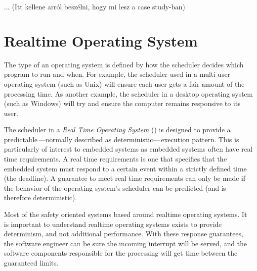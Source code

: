 ... (Itt kellene arról beszélni, hogy mi lesz a case study-ban)

\section{Realtime Operating System}

The type of an operating system is defined by how the scheduler decides which program to run and when. For example, the scheduler used in a multi user operating system (such as Unix) will ensure each user gets a fair amount of the processing time. As another example, the scheduler in a desktop operating system (such as Windows) will try and ensure the computer remains responsive to its user.

The scheduler in a \emph{Real Time Operating System} (\rtos) is designed to provide a predictable\,---normally described as deterministic---\,execution pattern. This is particularly of interest to embedded systems as embedded systems often have real time requirements. A real time requirements is one that specifies that the embedded system must respond to a certain event within a strictly defined time (the deadline). A guarantee to meet real time requirements can only be made if the behavior of the operating system's scheduler can be predicted (and is therefore deterministic).\citep{RTOS}

Most of the safety oriented systems based around realtime operating systems. It is important to understand realtime operating systems exists to provide determinism, and not additional performance. With these response guarantees, the software engineer can be sure the incoming interrupt will be served, and the software components responsible for the processing will get \cpu time between the guaranteed limits.
